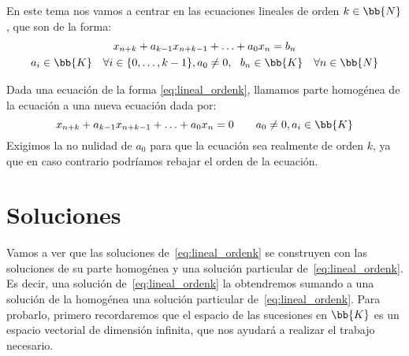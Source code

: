 En este tema nos vamos a centrar en las ecuaciones lineales de orden $k\in \bb{N}$, que son de la forma:
\begin{multline}\label{eq:lineal_ordenk}
    x_{n+k} + a_{k-1}x_{n+k-1} + \ldots + a_0x_n = b_n \\
    a_i \in \bb{K}\quad \forall i\in \{0, \ldots, k-1\}, a_0\neq 0,~~b_n \in \bb{K} \quad\forall n\in \bb{N}
\end{multline}

\begin{definicion}
    Dada una ecuación de la forma \ref{eq:lineal_ordenk}, llamamos parte homogénea de la ecuación a una nueva ecuación dada por:
    \begin{equation*}
        x_{n+k} + a_{k-1}x_{n+k-1} + \ldots + a_0x_n = 0 \qquad a_0 \neq 0, a_i\in \bb{K}
    \end{equation*}
    Exigimos la no nulidad de $a_0$ para que la ecuación sea realmente de orden $k$, ya que en caso contrario podríamos rebajar el orden de la ecuación.
\end{definicion}


\section{Soluciones}
Vamos a ver que las soluciones de~\ref{eq:lineal_ordenk} se construyen con las soluciones de su parte homogénea y una solución particular de~\ref{eq:lineal_ordenk}. Es decir, una solución de~\ref{eq:lineal_ordenk} la obtendremos sumando a una solución de la homogénea una solución particular de~\ref{eq:lineal_ordenk}.
Para probarlo, primero recordaremos que el espacio de las sucesiones en $\bb{K}$ es un espacio vectorial de dimensión infinita, que nos ayudará a realizar el trabajo necesario.

